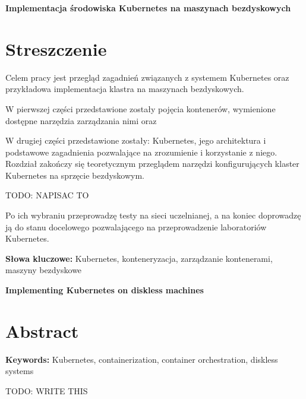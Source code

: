 \newpage
\begin{center}
  \large \bf
  Implementacja środowiska Kubernetes na maszynach bezdyskowych
\end{center}

\section*{Streszczenie}

Celem pracy jest przegląd zagadnień związanych z systemem Kubernetes oraz
przykładowa implementacja klastra na maszynach bezdyskowych.

W pierwszej części przedstawione zostały pojęcia kontenerów, wymienione
dostępne narzędzia zarządzania nimi oraz

W drugiej części przedstawione zostały: Kubernetes, jego architektura i podstawowe
zagadnienia pozwalające na zrozumienie i korzystanie z niego.
Rozdział zakończy się teoretycznym przeglądem narzędzi konfigurujących klaster
Kubernetes na sprzęcie bezdyskowym.

TODO: NAPISAC TO

Po ich wybraniu przeprowadzę testy na sieci uczelnianej, a na koniec doprowadzę
ją do stanu docelowego pozwalającego na przeprowadzenie laboratoriów Kubernetes.

\bigskip
{\noindent\bf Słowa kluczowe:} Kubernetes, konteneryzacja, zarządzanie kontenerami, maszyny bezdyskowe

\vskip 2cm


\begin{center}
  \large \bf
  Implementing Kubernetes on diskless machines
\end{center}

\section*{Abstract}


\bigskip
{\noindent\bf Keywords:} Kubernetes, containerization, container orchestration, diskless systems

TODO: WRITE THIS

\vfill
